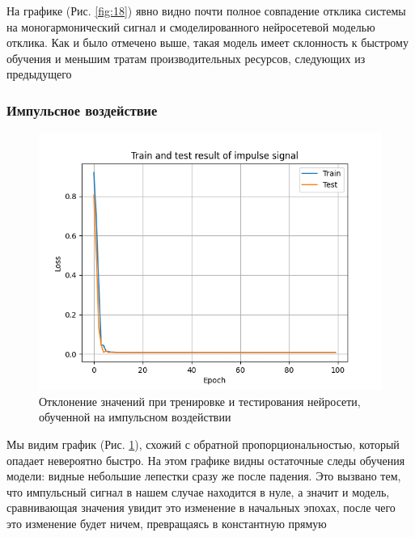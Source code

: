 На графике (Рис. \ref{fig:18}) явно видно почти полное совпадение отклика системы на моногармонический сигнал и смоделированного нейросетевой
моделью отклика. Как и было отмечено выше, такая модель имеет склонность к быстрому обучения и меньшим тратам производительных ресурсов, следующих из предыдущего

\subsubsection{Импульсное воздействие}

\begin{figure}[H]
	\centering
	\includegraphics[width=1\linewidth]{body/images/Train-and-test-result-of-impulse-signal.png}
	\caption{Отклонение значений при тренировке и тестирования нейросети, обученной на импульсном воздействии}
	\label{fig:19}
\end{figure}

Мы видим график (Рис. \ref{fig:19}), схожий с обратной пропорциональностью, который опадает невероятно быстро.
На этом графике видны остаточные следы обучения модели: видные небольшие лепестки сразу же после падения.
Это вызвано тем, что импульсный сигнал в нашем случае находится в нуле, а значит и модель, сравнивающая значения увидит это изменение
в начальных эпохах, после чего это изменение будет ничем, превращаясь в константную прямую


